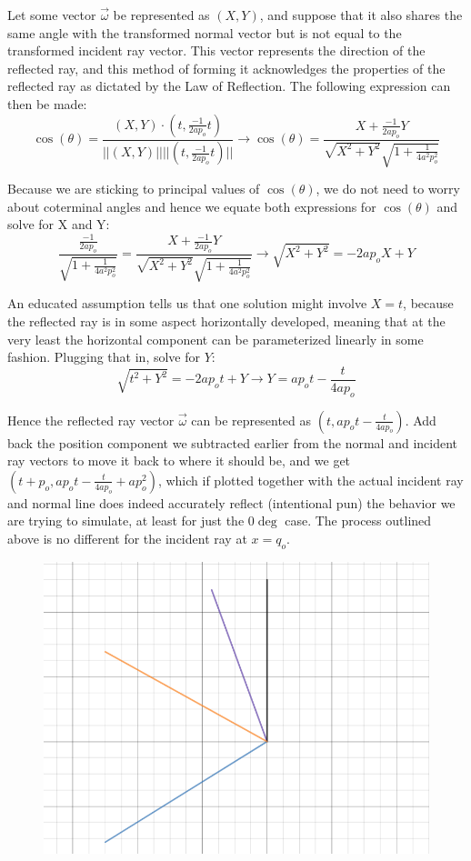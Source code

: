 \documentclass[10pt]{article}
\begin{document}
Let some vector $\vec{\omega}$ be represented as $(X,Y)$, and suppose that it also shares the same angle with the transformed normal vector but is not equal to the transformed incident ray vector. This vector represents the direction of the reflected ray, and this method of forming it acknowledges the properties of the reflected ray as dictated by the Law of Reflection. The following expression can then be made:
$$\cos(\theta)=\frac{(X,Y)\cdot\left(t,\frac{-1}{2ap_{o}}t\right)}{||(X,Y)||||\left(t,\frac{-1}{2ap_{o}}t\right)||} \to \cos(\theta)=\frac{X+\frac{-1}{2ap_{o}}Y}{\sqrt{X^2+Y^2}\sqrt{1+\frac{1}{4a^2p_{o}^2}}}$$

Because we are sticking to principal values of $\cos(\theta)$, we do not need to worry about coterminal angles and hence we equate both expressions for $\cos(\theta)$ and solve for X and Y:
$$\frac{\frac{-1}{2ap_{o}}}{\sqrt{1+\frac{1}{4a^2p_{o}^2}}}=\frac{X+\frac{-1}{2ap_{o}}Y}{\sqrt{X^2+Y^2}\sqrt{1+\frac{1}{4a^2p_{o}^2}}} \to \sqrt{X^2+Y^2}=-2ap_oX+Y$$

An educated assumption tells us that one solution might involve $X=t$, because the reflected ray is in some aspect horizontally developed, meaning that at the very least the horizontal component can be parameterized linearly in some fashion. Plugging that in, solve for $Y$:
$$\sqrt{t^2+Y^2}=-2ap_ot+Y \to Y=ap_{o}t-\frac{t}{4ap_{o}}$$

Hence the reflected ray vector $\vec{\omega}$ can be represented as $(t,ap_{o}t-\frac{t}{4ap_{o}})$. Add back the position component we subtracted earlier from the normal and incident ray vectors to move it back to where it should be, and we get $\left(t+p_{o},ap_{o}t-\frac{t}{4ap_{o}}+ap_{o}^{2}\right)$, which if plotted together with the actual incident ray and normal line does indeed accurately reflect (intentional pun) the behavior we are trying to simulate, at least for just the $0\deg$ case. The process outlined above is no different for the incident ray at $x=q_o$.

\begin{figure}[h]
\centering{}
\includegraphics[scale=0.3]{vec}
\end{figure}
\end{document}
